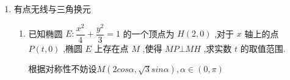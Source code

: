 \begin{enumerate}
\begin{enumerate}
\begin{jieda}
\begin{dingautolist}{172}
\begin{enumerate}[(1)]
                直线 ${AB}$ 的方程是 $y = \dfrac{\sqrt{2}}{2}x + \dfrac{\sqrt{6}}{2}$.
                \item $S = |sin(\alpha - \beta)| \leq 1$， 由第(2)小题的结论知, $S$ 可以取到 1,因此 $S$ 的最大值是 1.
            \end{enumerate}
        \end{dingautolist}
    \end{jieda}
    \item 已知椭圆 $\Gamma  : \dfrac{{x}^{2}}{16} + \dfrac{{y}^{2}}{4} = 1$ ,点 $O$ 为坐标原点,点 $M$ 为椭圆 $\Gamma$ 上一点，过线段 ${OM}$ 中点 $N$ 的直线 $l$ 交椭圆 $\Gamma$ 于 $P$ 、 $Q$ 两点， ${S}_{\bigtriangleup {PMQ}}$ 的最大值为.
    \begin{jieda}
        设直线$PQ: y = kx + m$，$P(x_1, y_2), Q(x_2, y_2)$

        联立$PQ$与椭圆的方程可得 $\left( {4{k}^{2} + 1}\right) {x^2} + {8kmx} + 4$，则 $\left\{ \begin{array}{l}
            {x}_{1} + {x}_{2} = \dfrac{-{8km}}{4{k}^{2} + 1} \\
            {x}_{1}{x}_{2} = \dfrac{4{m}^{2} - {16}}{4{k}^{2} + 1}
        \end{array} \right.$
    
        故$S_{PMQ} = S_{POQ} = \dfrac{\left| m\right| }{2}\left| {{x}_{1} - {x}_{2}}\right| = 2\dfrac{\left| m\right| \sqrt{4\left( {4{k}^{2} + 1}\right)  - {m}^{2}}}{4{k}^{2} + 1}$

        易知$N$的轨迹是$\dfrac{{x}^{2}}{4} + {y}^{2} = 1$，$PQ$与其有公共点，联立可得$(4k^2+1)x^2+8kmx+4m^2-4 = 0$，$\Delta = 64k^2m^2 - 16(m^2 - 1)(4k^2+1) \geq 0$，故$4k^2+1 \geq m^2$

        $S_{PMQ} = 2\sqrt{\dfrac{4{m}^{2}\left( {4{k}^{2} + 1}\right)  - {m}^{4}}{{\left( 4{k}^{2} + 1\right) }^{2}}} = 2\sqrt{-\dfrac{{m}^{4}}{{\left( 4{k}^{2} + 1\right) }^{2}} + 4\dfrac{{m}^{2}}{4{k}^{2} + 1}}$

        令$t = \dfrac{{m}^{2}}{4{k}^{2} + 1}, t \in [0, 1]$，故$S_{PMQ} = 2\sqrt{-t^2+4t} \leq 2\sqrt{3}$
    \end{jieda}
    \end{enumerate}

    \item 有点无线与三角换元
    \begin{enumerate}
        \item 已知椭圆 $E : \dfrac{{x}^{2}}{4} + \dfrac{{y}^{2}}{3} = 1$ 的一个顶点为 $H\left( {2,0}\right)$ ,对于 $x$ 轴上的点 $P\left( {t,0}\right)$ ,椭圆 $E$ 上存在点 $M$ ,使得 ${MP} \bot  {MH}$ ,求实数 $t$ 的取值范围.
        \begin{jieda}
            根据对称性不妨设$M(2cos\alpha, \sqrt{3}sin\alpha), \alpha \in (0, \pi)$
            

\end{jieda}
\end{enumerate}
\end{enumerate}
